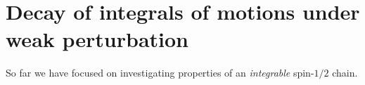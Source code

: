 \chapter{Decay of integrals of motions under weak perturbation}
\thispagestyle{chapterBeginStyle}

So far we have focused on investigating properties of an \textit{integrable} spin-\(1/2\) chain.

